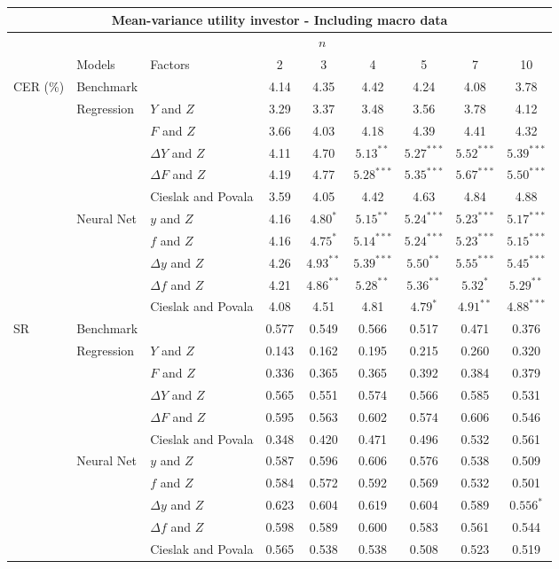 \begin{tabular}{lllcccccc}
    \hline
	\multicolumn{9}{c}{Mean-variance utility investor - Including macro data}\\\hline
	&& \multicolumn{6}{c}{$n$}\\\cline{4-9}
&Models&Factors   & 2  & 3      & 4       & 5       & 7 & 10 \\
\hline
CER (\%) & Benchmark &  & 4.14 & 4.35 & 4.42 & 4.24 & 4.08 & 3.78 \\
\cline{2-9}
 & Regression & $Y$ and $Z$ & 3.29 & 3.37 & 3.48 & 3.56 & 3.78 & 4.12 \\
 &  & $F$ and $Z$ & 3.66 & 4.03 & 4.18 & 4.39 & 4.41 & 4.32 \\
 &  & $\Delta Y$ and $Z$ & 4.11 & 4.70 & $5.13^{**}$ & $5.27^{***}$ & $5.52^{***}$ & $5.39^{***}$ \\
 &  & $\Delta F$ and $Z$ & 4.19 & 4.77 & $5.28^{***}$ & $5.35^{***}$ & $5.67^{***}$ & $5.50^{***}$ \\
 &  & Cieslak and Povala & 3.59 & 4.05 & 4.42 & 4.63 & 4.84 & 4.88 \\
\cline{2-9}
 & Neural Net & $y$ and $Z$ & 4.16 & $4.80^{*}$ & $5.15^{**}$ & $5.24^{***}$ & $5.23^{***}$ & $5.17^{***}$ \\
 &  & $f$ and $Z$ & 4.16 & $4.75^{*}$ & $5.14^{***}$ & $5.24^{***}$ & $5.23^{***}$ & $5.15^{***}$ \\
 &  & $\Delta y$ and $Z$ & 4.26 & $4.93^{**}$ & $5.39^{***}$ & $5.50^{**}$ & $5.55^{***}$ & $5.45^{***}$ \\
 &  & $\Delta f$ and $Z$ & 4.21 & $4.86^{**}$ & $5.28^{**}$ & $5.36^{**}$ & $5.32^{*}$ & $5.29^{**}$ \\
 &  & Cieslak and Povala & 4.08 & 4.51 & 4.81 & $4.79^{*}$ & $4.91^{**}$ & $4.88^{***}$ \\
    \hline
SR & Benchmark &  & 0.577 & 0.549 & 0.566 & 0.517 & 0.471 & 0.376 \\
\cline{2-9}
 & Regression & $Y$ and $Z$ & 0.143 & 0.162 & 0.195 & 0.215 & 0.260 & 0.320 \\
 &  & $F$ and $Z$ & 0.336 & 0.365 & 0.365 & 0.392 & 0.384 & 0.379 \\
 &  & $\Delta Y$ and $Z$ & 0.565 & 0.551 & 0.574 & 0.566 & 0.585 & 0.531 \\
 &  & $\Delta F$ and $Z$ & 0.595 & 0.563 & 0.602 & 0.574 & 0.606 & 0.546 \\
 &  & Cieslak and Povala & 0.348 & 0.420 & 0.471 & 0.496 & 0.532 & 0.561 \\
\cline{2-9}
 & Neural Net & $y$ and $Z$ & 0.587 & 0.596 & 0.606 & 0.576 & 0.538 & 0.509 \\
 &  & $f$ and $Z$ & 0.584 & 0.572 & 0.592 & 0.569 & 0.532 & 0.501 \\
 &  & $\Delta y$ and $Z$ & 0.623 & 0.604 & 0.619 & 0.604 & 0.589 & $0.556^{*}$ \\
 &  & $\Delta f$ and $Z$ & 0.598 & 0.589 & 0.600 & 0.583 & 0.561 & 0.544 \\
 &  & Cieslak and Povala & 0.565 & 0.538 & 0.538 & 0.508 & 0.523 & 0.519 \\
    \hline
    \end{tabular}
